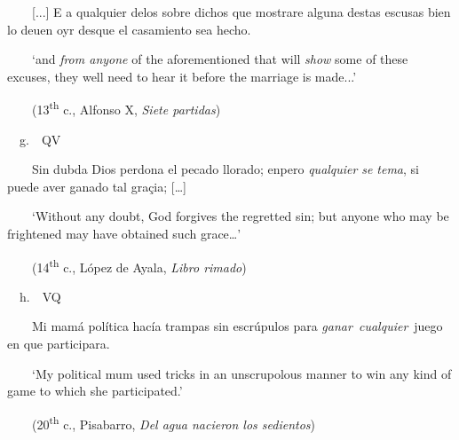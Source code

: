 \begin{styleStandard}
\ \ \ \ [...] E a qualquier delos sobre dichos que mostrare alguna destas escusas bien lo deuen oyr desque el casamiento sea hecho. 
\end{styleStandard}

\begin{styleStandard}
\ \ \ \ ‘and \textit{from anyone} of the aforementioned that will \textit{show} some of these excuses, they well need to hear it before the marriage is made...’
\end{styleStandard}

\begin{styleStandard}
\ \ \ \ (13\textsuperscript{th} c., Alfonso X, \textit{Siete partidas})
\end{styleStandard}

\begin{styleStandard}
\ \ g.\ \ QV
\end{styleStandard}

\begin{styleStandard}
\ \ \ \ Sin dubda Dios perdona el pecado llorado; enpero \textit{qualquier} \textit{se tema}, si puede aver ganado tal graçia; […]
\end{styleStandard}

\begin{styleStandard}
\ \ \ \ ‘Without any doubt, God forgives the regretted sin; but anyone who may be frightened may have obtained such grace…’
\end{styleStandard}

\begin{styleStandard}
\ \ \ \ (14\textsuperscript{th} c., López de Ayala,\textit{ Libro rimado})
\end{styleStandard}

\begin{styleStandard}
\ \ h.\ \ VQ
\end{styleStandard}

\begin{styleStandard}
\ \ \ \ Mi mamá política hacía trampas sin escrúpulos para \textit{ganar~cualquier}~juego en que participara. 
\end{styleStandard}

\begin{styleStandard}
\ \ \ \ ‘My political mum used tricks in an unscrupolous manner to win any kind of game to which she participated.’
\end{styleStandard}

\begin{styleStandard}
\ \ \ \ (20\textsuperscript{th }c., Pisabarro,\textit{ Del agua nacieron los sedientos})
\end{styleStandard}

